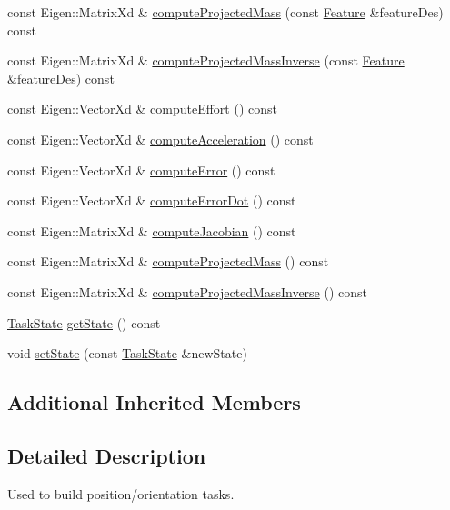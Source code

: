 \begin{DoxyCompactItemize}
const Eigen\+::\+Matrix\+Xd \& \hyperlink{classocra_1_1DisplacementFeature_a3c72ecae0cb33a812c66b0770baf09bf}{compute\+Projected\+Mass} (const \hyperlink{classocra_1_1Feature}{Feature} \&feature\+Des) const
\item 
const Eigen\+::\+Matrix\+Xd \& \hyperlink{classocra_1_1DisplacementFeature_a4b2e46d41b46c9af72f21f6dcdeec5f5}{compute\+Projected\+Mass\+Inverse} (const \hyperlink{classocra_1_1Feature}{Feature} \&feature\+Des) const
\item 
const Eigen\+::\+Vector\+Xd \& \hyperlink{classocra_1_1DisplacementFeature_aee1c2f5af98c28e8d6ab3dbeb5c3c297}{compute\+Effort} () const
\item 
const Eigen\+::\+Vector\+Xd \& \hyperlink{classocra_1_1DisplacementFeature_a1f2fa6644359c3897ac8d3e4e06c5f81}{compute\+Acceleration} () const
\item 
const Eigen\+::\+Vector\+Xd \& \hyperlink{classocra_1_1DisplacementFeature_ac0520f1a870558227ba6d5339a243414}{compute\+Error} () const
\item 
const Eigen\+::\+Vector\+Xd \& \hyperlink{classocra_1_1DisplacementFeature_a684821d2a83945c63661eacdf4bcd262}{compute\+Error\+Dot} () const
\item 
const Eigen\+::\+Matrix\+Xd \& \hyperlink{classocra_1_1DisplacementFeature_a87e2abee5d1072e142dcab99193699da}{compute\+Jacobian} () const
\item 
const Eigen\+::\+Matrix\+Xd \& \hyperlink{classocra_1_1DisplacementFeature_a31902186d804823eea5ba0177ed85ced}{compute\+Projected\+Mass} () const
\item 
const Eigen\+::\+Matrix\+Xd \& \hyperlink{classocra_1_1DisplacementFeature_a3639d72ab7b85ac4b9533ed6498c0c03}{compute\+Projected\+Mass\+Inverse} () const
\item 
\hyperlink{classocra_1_1TaskState}{Task\+State} \hyperlink{classocra_1_1DisplacementFeature_a3940d5c27ee1845c65f4be6ad3a27e50}{get\+State} () const
\item 
void \hyperlink{classocra_1_1DisplacementFeature_a7a99c7e57d512ec2d6094fc10388e033}{set\+State} (const \hyperlink{classocra_1_1TaskState}{Task\+State} \&new\+State)
\end{DoxyCompactItemize}
\subsection*{Additional Inherited Members}


\subsection{Detailed Description}
Used to build position/orientation tasks. 

